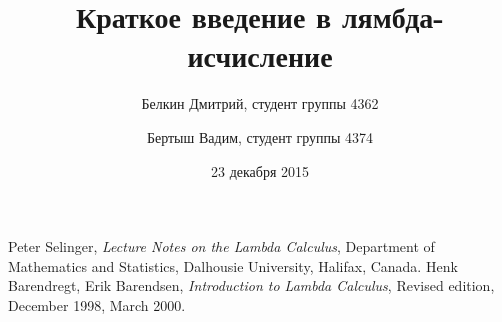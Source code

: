 \documentclass{article}
\begin{document}
\title{Краткое введение в лямбда-исчисление}
\author{Белкин Дмитрий, студент группы 4362
\and Бертыш Вадим, студент группы 4374}
\date{23 декабря 2015}
\maketitle
\newpage


\newpage

\newpage




\newpage
\begin{thebibliography}{9}
	Peter Selinger,
	\emph{Lecture Notes on the Lambda Calculus},
	Department of Mathematics and Statistics,
	Dalhousie University,
	Halifax,
	Canada.
	Henk Barendregt,
	Erik Barendsen,
	\emph{Introduction to Lambda Calculus},
	Revised edition,
	December 1998,
	March 2000.
\end{thebibliography}
\end{document}
